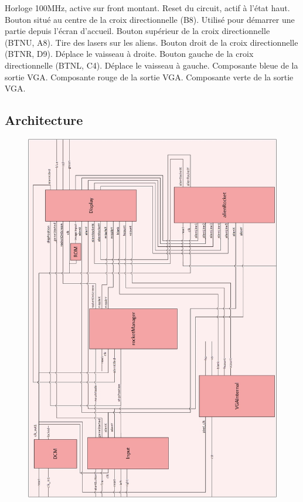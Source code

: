 \documentclass[french]{nakrule}
\begin{document}
\begin{descr}
   Horloge 100MHz, active sur front montant.
   Reset du circuit, actif à l'état haut.
   Bouton situé au centre de la croix directionnelle (B8).
  Utilisé pour démarrer une partie depuis l'écran d'accueil.
   Bouton supérieur de la croix directionnelle (BTNU, A8). Tire des lasers sur les aliens.
   Bouton droit de la croix directionnelle (BTNR, D9). Déplace le vaisseau à droite.
   Bouton gauche de la croix directionnelle (BTNL, C4). Déplace le vaisseau à gauche.
   Composante bleue de la sortie VGA.
   Composante rouge de la sortie VGA.
   Composante verte de la sortie VGA.
\end{descr}

\clearpage

\subsection{Architecture}
\label{sub:architecture}

\begin{figure}[h!]
   \centering
   \includegraphics[width=\textwidth,height=.9\textheight]{pictures/TopModuleArchitecture}
\end{figure}
\end{document}
